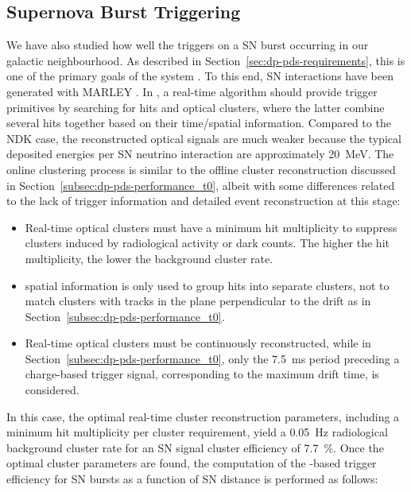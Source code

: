 

\subsection{Supernova Burst Triggering}
\label{subsec:dp-pds-performance_trigger}

We have also studied how well the   triggers on a SN burst occurring in our galactic neighbourhood. As described in Section~\ref{sec:dp-pds-requirements}, this is one of the primary goals of the system . To this end, SN \nue {} interactions have been generated with MARLEY \cite{marley}. In , a real-time algorithm should provide trigger primitives by searching for  hits and optical clusters, where the latter combine several hits together based on their time/spatial information. Compared to the NDK case, the reconstructed optical signals are much weaker because the typical deposited energies per SN neutrino interaction are approximately \SI{20}{\MeV}. The online clustering process is similar to the offline cluster reconstruction discussed in Section~\ref{subsec:dp-pds-performance_t0}, albeit with some differences related to the lack of trigger information and detailed event reconstruction at this stage:
%
\begin{itemize}
\item Real-time optical clusters must have a minimum hit multiplicity to suppress clusters induced by radiological activity or  dark counts. The higher the hit multiplicity, the lower the background cluster rate.
\item {} spatial information is only used to group hits into separate clusters,  not to match  clusters with  tracks in the plane perpendicular to the drift as in Section~\ref{subsec:dp-pds-performance_t0}.
\item Real-time optical clusters must be continuously reconstructed, while in Section~\ref{subsec:dp-pds-performance_t0}, only the \SI{7.5}{\milli\s} period preceding a charge-based trigger signal, corresponding to the maximum drift time, is considered.
\end{itemize}
%
In this case, the optimal real-time cluster reconstruction parameters, including a minimum hit multiplicity per cluster requirement, yield a \SI{0.05}{\Hz} radiological background cluster rate for an SN \nue {} signal cluster efficiency of \SI{7.7}{\%}. Once the optimal cluster parameters are found, the computation of the -based trigger efficiency for SN bursts as a function of SN distance is performed as follows:

